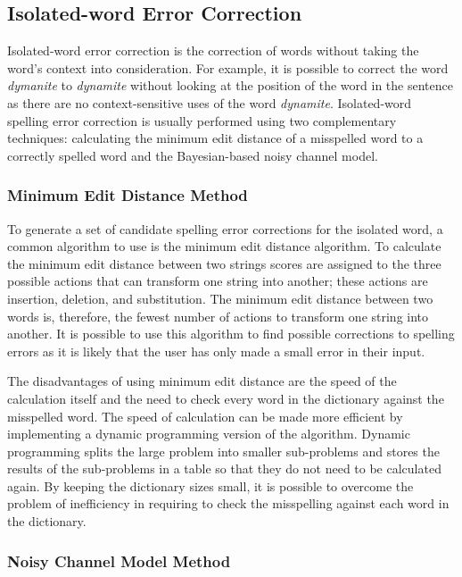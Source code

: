 \subsection{Isolated-word Error Correction}

Isolated-word error correction is the correction of words without taking the word's context into consideration. For example, it is possible to correct the word \emph{dymanite} to \emph{dynamite} without looking at the position of the word in the sentence as there are no context-sensitive uses of the word \emph{dynamite}. Isolated-word spelling error correction is usually performed using two complementary techniques: calculating the minimum edit distance of a misspelled word to a correctly spelled word and the Bayesian-based noisy channel model.

\subsubsection{Minimum Edit Distance Method}

To generate a set of candidate spelling error corrections for the isolated word, a common algorithm to use is the minimum edit distance algorithm. To calculate the minimum edit distance between two strings scores are assigned to the three possible actions that can transform one string into another; these actions are insertion, deletion, and substitution. The minimum edit distance between two words is, therefore, the fewest number of actions to transform one string into another. It is possible to use this algorithm to find possible corrections to spelling errors as it is likely that the user has only made a small error in their input.

The disadvantages of using minimum edit distance are the speed of the calculation itself and the need to check every word in the dictionary against the misspelled word. The speed of calculation can be made more efficient by implementing a dynamic programming version of the algorithm. Dynamic programming splits the large problem into smaller sub-problems and stores the results of the sub-problems in a table so that they do not need to be calculated again. By keeping the dictionary sizes small, it is possible to overcome the problem of inefficiency in requiring to check the misspelling against each word in the dictionary.

\subsubsection{Noisy Channel Model Method}

